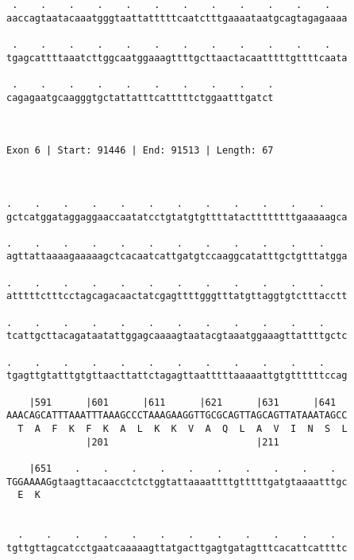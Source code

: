\documentclass{article}
\begin{document}
\begin{Verbatim}
 .    .    .    .    .    .    .    .    .    .    .    .   
aaccagtaatacaaatgggtaattatttttcaatctttgaaaataatgcagtagagaaaa
                                                            
 .    .    .    .    .    .    .    .    .    .    .    .   
tgagcattttaaatcttggcaatggaaagttttgcttaactacaatttttgttttcaata
                                                            
 .    .    .    .    .    .    .    .    .    .
cagagaatgcaagggtgctattatttcatttttctggaatttgatct
                                               
                                               
 
Exon 6 | Start: 91446 | End: 91513 | Length: 67



.    .    .    .    .    .    .    .    .    .    .    .    
gctcatggataggaggaaccaatatcctgtatgtgttttatacttttttttgaaaaagca
                                                            
.    .    .    .    .    .    .    .    .    .    .    .    
agttattaaaagaaaaagctcacaatcattgatgtccaaggcatatttgctgtttatgga
                                                            
.    .    .    .    .    .    .    .    .    .    .    .    
atttttctttcctagcagacaactatcgagttttgggtttatgttaggtgtctttacctt
                                                            
.    .    .    .    .    .    .    .    .    .    .    .    
tcattgcttacagataatattggagcaaaagtaatacgtaaatggaaagttattttgctc
                                                            
.    .    .    .    .    .    .    .    .    .    .    .    
tgagttgtatttgtgttaacttattctagagttaatttttaaaaattgtgttttttccag
                                                            
    |591      |601      |611      |621      |631      |641  
AAACAGCATTTAAATTTAAAGCCCTAAAGAAGGTTGCGCAGTTAGCAGTTATAAATAGCC
  T  A  F  K  F  K  A  L  K  K  V  A  Q  L  A  V  I  N  S  L
              |201                          |211            
  
    |651    .    .    .    .    .    .    .    .    .    .  
TGGAAAAGgtaagttacaacctctctggtattaaaattttgtttttgatgtaaaatttgc
  E  K                                                      
                                                            
  
  .    .    .    .    .    .    .    .    .    .    .    .  
tgttgttagcatcctgaatcaaaaagttatgacttgagtgatagtttcacattcattttc
                                                            

\end{Verbatim}
\end{document}
